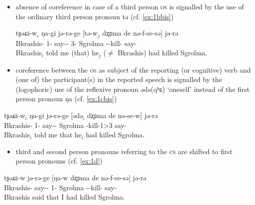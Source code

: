 \documentclass[oneside,a4paper,11pt]{article}
\newcommand{\ipa}[1]{{\phon #1}} %
\newcommand{\ipapl}[1]{{\phondroit #1}}
\begin{document}
\begin{itemize}

 \item absence of coreference in case of a third person \textsc{os} is signalled by the use of the ordinary third person pronoun \ipa{tə} (cf. \ref{ex:1bbis})

\begin{exe}
\ex \label{ex:1bbis}
\gll
	\ipa{tʂaɕi-w}$_i$ \ipa{ŋa-gi}	\ipa{jə-rə-ge} [\ipapl{tə-w}$_j$	\ipapl{dʐʚma} 	\ipapl{de} \ipapl{nə-f-se-sə}] \ipa{jə-rə}  \\
	{Bkrashis-\erg} {1\sg-\dat} {say-\const-\conv} {3\sg-\erg} Sgrolma {\dem} {\prf-\inv-kill-\evid}  say-\const\\ 
	\glt Bkrashis$_i$ told me (that) he$_j$ ($\ne$ Bkrashis) had killed Sgrolma.
\end{exe}

\end{itemize}


\begin{itemize}
 \item coreference between the \textsc{os} as subject of the reporting (or cognitive) verb and (one of) the participant(s) in the reported speech is signalled by the (logophoric) use of the reflexive pronoun \ipa{ədə(qʰʚ)} `oneself' instead of the first person pronoun \ipa{ŋa} (cf. \ref{ex:1cbis})
\end{itemize}


\begin{exe}
\ex \label{ex:1cbis}
\gll
	\ipa{tʂaɕi-w}$_i$ \ipa{ŋa-gi}	\ipa{jə-rə-ge} [\ipapl{ədə}$_i$	\ipapl{dʐʚma} 	\ipapl{de} 	\ipapl{nə-se-w}] \ipa{jə-rə}  \\
	{Bkrashis-\erg} {1\sg-\dat} {say-\const-\conv} {} Sgrolma {\dem} {\prf-kill-1\sg>3} say-\const\\ 
	\glt Bkrashis$_i$ told me that he$_i$ had killed Sgrolma.
\end{exe}


\begin{itemize}
\item third and second person pronouns referring to the \textsc{cs} are shifted to first person pronouns (cf. \ref{ex:1d})
\end{itemize}

\begin{exe}
\ex \label{ex:1d}
\gll
	\ipa{tʂaɕi-w}	\ipa{jə-rə-ge} [\ipapl{ŋa-w} \ipapl{dʐʚma} \ipapl{de} \ipapl{nə-f-se-sə}] \ipa{jə-rə}  \\
	{Bkrashis-\erg} {say-\const-\conv} {1\sg-\erg} Sgrolma {\dem} {\prf-\inv-kill-\evid} say-\const\\ 
	\glt Bkrashis said that I had killed Sgrolma.
\end{exe}
\end{document}
